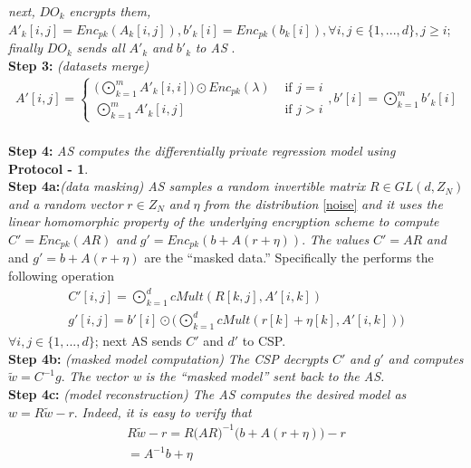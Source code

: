 \textit{ next, }$DO_k$ \textit{ encrypts them, } $A'_k[i,j]=Enc_{pk}(A_k[i,j]), b'_k[i]=Enc_{pk}(b_k[i]), \forall i,j \in \{1,...,d\}, j\geq i$; \textit{ finally } $DO_k$ \textit{ sends all } $A'_k$ \textit{ and } $b'_k$ \textit{ to AS }.
\\
\textbf{Step 3:} \textit{(datasets merge) }\begin{gather*}A'[i,j]=\begin{cases}\Big(\bigodot^m_{k=1}A'_k[i,i]\Big)\odot Enc_{pk}(\lambda) &\mbox{ if } j=i\\\bigodot_{k=1}^m A'_k[i,j] &\mbox{ if } j > i\end{cases},b'[i]=\bigodot_{k=1}^m b'_k[i]\end{gather*}
\\\textbf{Step 4:} \textit{ AS computes the differentially private regression model using } \\\textbf{Protocol - 1}.
\\ \textbf{Step 4a:}\textit{(data masking) AS samples a random invertible matrix } $R \in GL(d,Z_N)$ \textit{ and a random vector } $r \in Z_N$ \textit{ and } $\eta$ \textit{ from the distribution  } \eqref{noise} \textit{ and it uses the linear homomorphic property of the underlying encryption
scheme to compute } $C'= Enc_{pk}(AR)$ \textit{ and } $g'=Enc_{pk}(b + A(r+\eta))$. \textit{ The values } $C'= AR$ \textit{ and } and
$g'=  b + A(r+\eta)$ are the “masked data.” Specifically the performs the following operation \begin{gather*} C'[i,j]=\bigodot^d_{k=1}cMult(R[k,j],A'[i,k])\\g'[i,j]=b'[i]\odot\Big(\bigodot^d_{k=1}cMult(r[k]+\eta[k],A'[i,k])\Big)\end{gather*}
$\forall i,j \in\{1,...,d\}$; next AS sends $C'$ and $d'$ to CSP.
\\\textbf{Step 4b: }\textit{(masked model computation)}
\textit{ The CSP decrypts } $C'$ \textit{ and }$g'$ \textit{ and computes }$\tilde{w}=  C^{-1}g$. \textit{ The vector w is the “masked
model” sent back to the AS.}
 \\\textbf{Step 4c:} \textit{(model reconstruction) The AS computes the desired model as } $w =R\tilde{w} - r$. \textit{ Indeed, it is easy to verify that}
\begin{gather*}R\tilde{w} - r =R\big(AR)^{-1}(b+A(r+\eta)\big)-r\\=A^{-1}b+\eta
\end{gather*}
